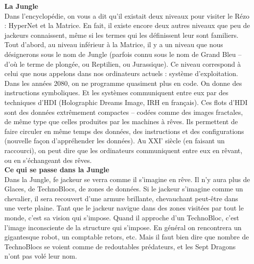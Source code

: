 \documentclass[11pt,twoside,a4paper]{article}
\begin{document}
\begin{multicols}{3}
\scriptsize{

\textbf{\Large La Jungle}~\\

Dans l'encyclop{\'e}die, on vous a dit qu'il existait deux niveaux pour visiter le R{\'e}zo : HyperNet et la Matrice. En fait, il existe encore deux autres niveaux que peu de jackeurs connaissent, m{\^e}me si les termes qui les d{\'e}finissent leur sont familiers.~\\

Tout d'abord, au niveau inf{\'e}rieur {\`a} la Matrice, il y a un niveau que nous d{\'e}signerons sous le nom de Jungle (parfois connu sous le nom de Grand Bleu -- d'o{\`u} le terme de plong{\'e}e, ou Reptilien, ou Jurassique). Ce niveau correspond {\`a} celui que nous appelons dans nos ordinateurs actuels : syst{\`e}me d'exploitation. Dans les ann{\'e}es 2080, on ne programme quasiment plus en code. On donne des instructions symboliques. Et les syst{\`e}mes communiquent entre eux par des techniques d'HDI (Holographic Dreams Image, IRH en fran\c{c}ais). Ces flots d'HDI sont des donn{\'e}es extr{\^e}mement compactes -- cod{\'e}es comme des images fractales, de m{\^e}me type que celles produites par les machines {\`a} r{\^e}ves. Ils permettent de faire circuler en m{\^e}me temps des donn{\'e}es, des instructions et des configurations (nouvelle fa\c{c}on d'appr{\'e}hender les donn{\'e}es). Au XXI' si{\`e}cle (en faisant un raccourci), on peut dire que les ordinateurs communiquent entre eux en r{\^e}vant, ou en s'{\'e}changeant des r{\^e}ves.~\\

\textbf{\large Ce qui se passe dans la Jungle}~\\

Dans la Jungle, fe jackeur se verra comme il s'imagine en r{\^e}ve. Il n'y aura plus de Glaces, de TechnoBlocs, de zones de donn{\'e}es. Si le jackeur s'imagine comme un chevalier, il sera recouvert d'une armure brillante, chevauchant peut-{\^e}tre dans une verte plaine. Tant que le jackeur navigue dans des zones visit{\'e}es par tout le monde, c'est sa vision qui s'impose. Quand il approche d'un TechnoBloc, c'est l'image inconsciente de la structure qui s'impose. En g{\'e}n{\'e}ral on rencontrera un gigantesque robot, un comptable retors, etc. Mais il faut bien dire que nombre de TechnoBlocs se voient comme de redoutables pr{\'e}dateurs, et les Sept Dragons n'ont pas vol{\'e} leur nom.~\\

}
\end{multicols}
\end{document}

